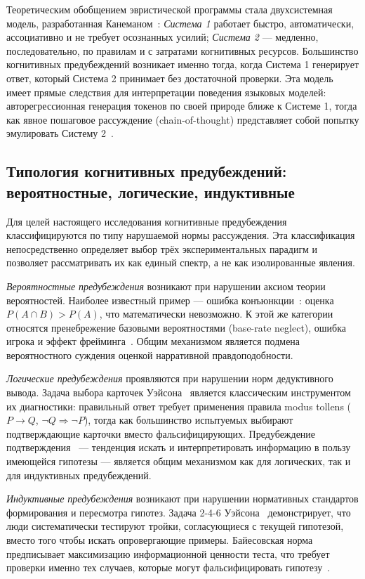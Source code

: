 Теоретическим обобщением эвристической программы стала двухсистемная модель, разработанная Канеманом~\cite{kahneman2011thinking}: \textit{Система 1} работает быстро, автоматически, ассоциативно и не требует осознанных усилий; \textit{Система 2} --- медленно, последовательно, по правилам и с затратами когнитивных ресурсов. Большинство когнитивных предубеждений возникает именно тогда, когда Система 1 генерирует ответ, который Система 2 принимает без достаточной проверки. Эта модель имеет прямые следствия для интерпретации поведения языковых моделей: авторегрессионная генерация токенов по своей природе ближе к Системе 1, тогда как явное пошаговое рассуждение (chain-of-thought) представляет собой попытку эмулировать Систему 2~\cite{wei2022chain}.

\subsection{Типология когнитивных предубеждений: вероятностные, логические, индуктивные}

Для целей настоящего исследования когнитивные предубеждения классифицируются по типу нарушаемой нормы рассуждения. Эта классификация непосредственно определяет выбор трёх экспериментальных парадигм и позволяет рассматривать их как единый спектр, а не как изолированные явления.

\textit{Вероятностные предубеждения} возникают при нарушении аксиом теории вероятностей. Наиболее известный пример --- ошибка конъюнкции~\cite{tversky1983extensional}: оценка $P(A \cap B) > P(A)$, что математически невозможно. К этой же категории относятся пренебрежение базовыми вероятностями (base-rate neglect), ошибка игрока и эффект фрейминга~\cite{tversky1981framing}. Общим механизмом является подмена вероятностного суждения оценкой нарративной правдоподобности.

\textit{Логические предубеждения} проявляются при нарушении норм дедуктивного вывода. Задача выбора карточек Уэйсона~\cite{wason1966reasoning} является классическим инструментом их диагностики: правильный ответ требует применения правила modus tollens ($P \rightarrow Q$, $\lnot Q \Rightarrow \lnot P$), тогда как большинство испытуемых выбирают подтверждающие карточки вместо фальсифицирующих. Предубеждение подтверждения~\cite{nickerson1998confirmation} --- тенденция искать и интерпретировать информацию в пользу имеющейся гипотезы --- является общим механизмом как для логических, так и для индуктивных предубеждений.

\textit{Индуктивные предубеждения} возникают при нарушении нормативных стандартов формирования и пересмотра гипотез. Задача 2-4-6 Уэйсона~\cite{wason1960failure} демонстрирует, что люди систематически тестируют тройки, согласующиеся с текущей гипотезой, вместо того чтобы искать опровергающие примеры. Байесовская норма предписывает максимизацию информационной ценности теста, что требует проверки именно тех случаев, которые могут фальсифицировать гипотезу~\cite{tenenbaum1999bayesian}.

